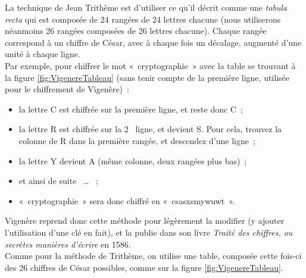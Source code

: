 La technique de Jean Trithème est d'utiliser ce qu'il décrit comme une
\emph{tabula recta} qui est composée de 24 rangées de 24
lettres chacune (nous utiliserons néanmoins 26 rangées composées
de 26 lettres chacune). 
Chaque rangée correspond à un chiffre de César,
avec à chaque fois un décalage, augmenté d'une unité à chaque ligne. \\

Par exemple, pour chiffrer le mot «~cryptographie~» avec la table se
trouvant à la figure \ref{fig:VigenereTableau} (sans tenir 
compte de la première ligne, utilisée pour le chiffrement de
Vigenère)~: 
\begin{itemize}
  \item la lettre C est chiffrée sur la première ligne, et reste
    donc C~;
  \item la lettre R est chiffrée sur la 2\ieme~ ligne, et devient
    S. Pour cela, trouvez la colonne de R dans la première rangée, et
    descendez d'une ligne~;
  \item la lettre Y devient A (même colonne, deux rangées plus bas)~;
  \item et ainsi de suite ~\dots ~ ;
  \item «~cryptographie~» sera donc chiffré en «~csasxsmywuwt~».
\end{itemize}


Vigenère reprend donc cette méthode pour légèrement la modifier (y
ajouter l'utilisation d'une clé en fait), et la publie dans son livre
\emph{Traité des chiffres, ou secrètes
  manières d'écrire} en 1586. \\

Comme pour la méthode de Trithème, on utilise une table, composée
cette fois-ci des 26 chiffres de César possibles, comme sur la figure
\ref{fig:VigenereTableau}. \\


